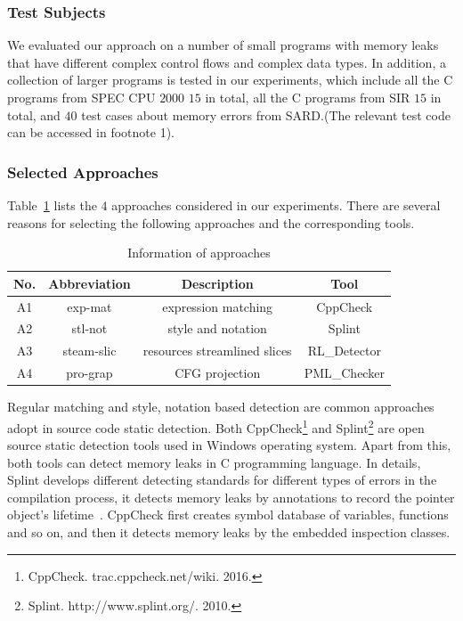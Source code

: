 \subsubsection{Test Subjects}\label{ssec:ts}
We evaluated our approach on a number of small programs with memory leaks that have different complex control flows and complex data types. In addition, a collection of larger programs is tested in our experiments, which include all the C programs from SPEC CPU $2000$ $15$ in total, all the C programs from SIR $15$ in total, and $40$ test cases about memory errors from SARD.(The relevant test code can be accessed in footnote 1).
\subsubsection{Selected Approaches}\label{ssec:ca}
Table~\ref{tab:1} lists the $4$ approaches considered in our experiments. There are several reasons for selecting the following approaches and the corresponding tools. 
%
\begin{table}[!h]
\center
\caption{Information of approaches}\label{tab:1}
\begin{tabular}{|c|c|c|c|}
\hline
\textbf{No.} & \textbf{Abbreviation} & \textbf{Description} & \textbf{Tool}\\
\hline
A1 & exp-mat & expression matching & CppCheck\\
\hline
A2 & stl-not & style and notation &	Splint\\
\hline
A3 & steam-slic & resources streamlined slices & RL\_Detector\\
\hline
A4 & pro-grap &	CFG projection &	PML\_Checker\\
\hline
\end{tabular}
\end{table}
%
Regular matching and style, notation based detection are common approaches adopt in source code static detection. Both CppCheck\footnote{CppCheck. trac.cppcheck.net/wiki. 2016.} and Splint\footnote{Splint. http://www.splint.org/. 2010.} are open source static detection tools used in Windows operating system. Apart from this, both tools can detect memory leaks in C programming language. In details, Splint develops different detecting standards for different types of errors in the compilation process, it detects memory leaks by annotations to record the pointer object’s lifetime~\cite{EL02}. CppCheck first creates symbol database of variables, functions and so on, and then it detects memory leaks by the embedded inspection classes.
 
